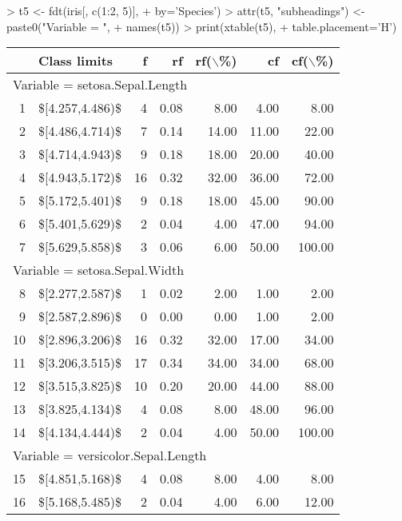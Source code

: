 \documentclass[10pt,a4paper]{article}
\begin{document}
\begin{Schunk}
\begin{Sinput}
> t5 <- fdt(iris[, c(1:2, 5)],
+           by='Species')
> attr(t5, "subheadings") <- paste0("Variable = ",
+                                   names(t5))
> print(xtable(t5),
+      table.placement='H')
\end{Sinput}
% latex table generated in R 4.4.0 by xtable 1.8-4 package
% Fri Nov 17 16:34:40 2023
\begin{table}[H]
\centering
\begin{tabular}{rlrrrrr}
  \hline
 & Class limits & f & rf & rf($\backslash$\%) & cf & cf($\backslash$\%) \\ 
  \hline
\multicolumn{7}{l}{Variable = setosa.Sepal.Length}\\
1 & \$[4.257,4.486)\$ &   4 & 0.08 & 8.00 & 4.00 & 8.00 \\ 
  2 & \$[4.486,4.714)\$ &   7 & 0.14 & 14.00 & 11.00 & 22.00 \\ 
  3 & \$[4.714,4.943)\$ &   9 & 0.18 & 18.00 & 20.00 & 40.00 \\ 
  4 & \$[4.943,5.172)\$ &  16 & 0.32 & 32.00 & 36.00 & 72.00 \\ 
  5 & \$[5.172,5.401)\$ &   9 & 0.18 & 18.00 & 45.00 & 90.00 \\ 
  6 & \$[5.401,5.629)\$ &   2 & 0.04 & 4.00 & 47.00 & 94.00 \\ 
  7 & \$[5.629,5.858)\$ &   3 & 0.06 & 6.00 & 50.00 & 100.00 \\ 
   \hline
\multicolumn{7}{l}{Variable = setosa.Sepal.Width}\\
8 & \$[2.277,2.587)\$ &   1 & 0.02 & 2.00 & 1.00 & 2.00 \\ 
  9 & \$[2.587,2.896)\$ &   0 & 0.00 & 0.00 & 1.00 & 2.00 \\ 
  10 & \$[2.896,3.206)\$ &  16 & 0.32 & 32.00 & 17.00 & 34.00 \\ 
  11 & \$[3.206,3.515)\$ &  17 & 0.34 & 34.00 & 34.00 & 68.00 \\ 
  12 & \$[3.515,3.825)\$ &  10 & 0.20 & 20.00 & 44.00 & 88.00 \\ 
  13 & \$[3.825,4.134)\$ &   4 & 0.08 & 8.00 & 48.00 & 96.00 \\ 
  14 & \$[4.134,4.444)\$ &   2 & 0.04 & 4.00 & 50.00 & 100.00 \\ 
   \hline
\multicolumn{7}{l}{Variable = versicolor.Sepal.Length}\\
15 & \$[4.851,5.168)\$ &   4 & 0.08 & 8.00 & 4.00 & 8.00 \\ 
  16 & \$[5.168,5.485)\$ &   2 & 0.04 & 4.00 & 6.00 & 12.00 \\ 

\end{tabular}
\end{table}
\end{Schunk}
\end{document}
